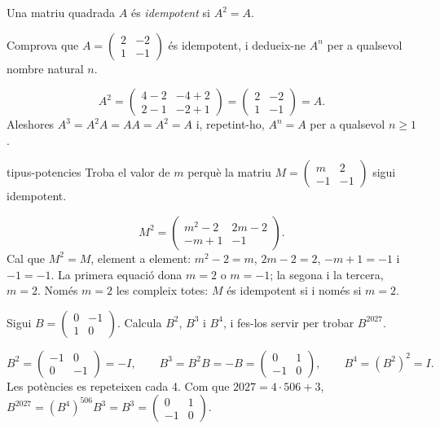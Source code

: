 Una matriu quadrada $A$ és \emph{idempotent} si $A^2=A$.

\begin{apartats}

Comprova que $A=\begin{pmatrix}2&-2\\1&-1\end{pmatrix}$ és idempotent, i dedueix-ne $A^n$ per a
qualsevol nombre natural $n$.

\begin{solucio}
\[
A^2=\begin{pmatrix}4-2&-4+2\\2-1&-2+1\end{pmatrix}=\begin{pmatrix}2&-2\\1&-1\end{pmatrix}=A.
\]
Aleshores $A^3=A^2A=AA=A^2=A$ i, repetint-ho, $A^n=A$ per a qualsevol $n\ge1$.
\end{solucio}

\begin{tria}{tipus-potencies}
Troba el valor de $m$ perquè la matriu $M=\begin{pmatrix}m&2\\-1&-1\end{pmatrix}$ sigui idempotent.

\begin{solucio}
\[
M^2=\begin{pmatrix}m^2-2&2m-2\\-m+1&-1\end{pmatrix}.
\]
Cal que $M^2=M$, element a element: $m^2-2=m$, $2m-2=2$, $-m+1=-1$ i $-1=-1$. La primera equació dona
$m=2$ o $m=-1$; la segona i la tercera, $m=2$. Només $m=2$ les compleix totes: $M$ és idempotent si i
només si $m=2$.
\end{solucio}

Sigui $B=\begin{pmatrix}0&-1\\1&0\end{pmatrix}$. Calcula $B^2$, $B^3$ i $B^4$, i fes-los servir per
trobar $B^{2027}$.

\begin{solucio}
\[
B^2=\begin{pmatrix}-1&0\\0&-1\end{pmatrix}=-I,\qquad
B^3=B^2B=-B=\begin{pmatrix}0&1\\-1&0\end{pmatrix},\qquad
B^4=(B^2)^2=I.
\]
Les potències es repeteixen cada 4. Com que $2027=4\cdot506+3$,
$B^{2027}=(B^4)^{506}B^3=B^3=\begin{pmatrix}0&1\\-1&0\end{pmatrix}$.
\end{solucio}
\end{tria}


\end{apartats}
